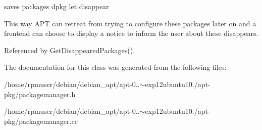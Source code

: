 saves packages dpkg let disappear 

\-This way \-A\-P\-T can retreat from trying to configure these packages later on and a frontend can choose to display a notice to inform the user about these disappears. 

\-Referenced by \-Get\-Disappeared\-Packages().



\-The documentation for this class was generated from the following files\-:\begin{DoxyCompactItemize}
\item 
/home/rpmuser/debian/debian\-\_\-apt/apt-\/0..$\sim$exp12ubuntu10./apt-\/pkg/packagemanager.\-h\item 
/home/rpmuser/debian/debian\-\_\-apt/apt-\/0..$\sim$exp12ubuntu10./apt-\/pkg/packagemanager.\-cc\end{DoxyCompactItemize}

